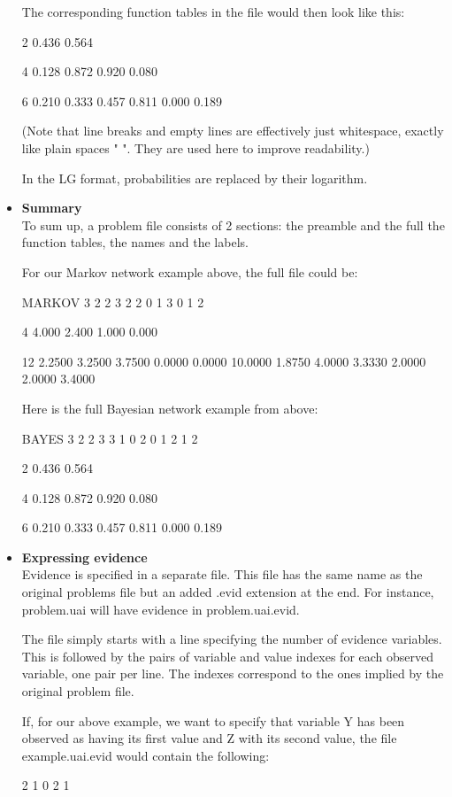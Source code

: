 \documentclass{article}
\begin{document}
\begin{itemize}
The corresponding function tables in the file would then look like this:

\begin{DoxyCode}
2
 0.436 0.564

4
 0.128 0.872
 0.920 0.080

6
 0.210 0.333 0.457
 0.811 0.000 0.189 
\end{DoxyCode}

(Note that line breaks and empty lines are effectively just whitespace, exactly like plain spaces " ". They are used here to improve readability.)

In the LG format, probabilities are replaced by their logarithm.

\item {\bf Summary}~\\

To sum up, a problem file consists of 2 sections: the preamble and the full the function tables, the names and the labels.

For our Markov network example above, the full file could be:

\begin{DoxyCode}
MARKOV
3
2 2 3
2
2 0 1
3 0 1 2

4
 4.000 2.400
 1.000 0.000

12
 2.2500 3.2500 3.7500
 0.0000 0.0000 10.0000
 1.8750 4.0000 3.3330
 2.0000 2.0000 3.4000
\end{DoxyCode}

Here is the full Bayesian network example from above:

\begin{DoxyCode}
BAYES
3
2 2 3
3
1 0
2 0 1
2 1 2

2
 0.436 0.564

4
 0.128 0.872
 0.920 0.080

6
 0.210 0.333 0.457
 0.811 0.000 0.189 
\end{DoxyCode}

\item {\bf Expressing evidence}~\\

Evidence is specified in a separate file. This file has the same name as the original problems file but an added .evid extension at the end. For instance, problem.uai will have evidence in problem.uai.evid.

The file simply starts with a line specifying the number of evidence variables. This is followed by the pairs of variable and value indexes for each observed variable, one pair per line. The indexes correspond to the ones implied by the original problem file.

If, for our above example, we want to specify that variable Y has been observed as having its first value and Z with its second value, the file example.uai.evid would contain the following:

\begin{DoxyCode}
2
 1 0
 2 1
\end{DoxyCode}
\end{itemize}
\end{document}
